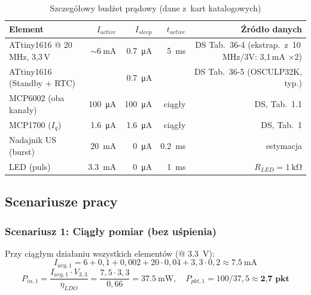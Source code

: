 \documentclass[a4paper,11pt]{article}
\begin{document}
\begin{table}[H]
    \centering
    \caption{Szczegółowy budżet prądowy (dane z~kart katalogowych)}
    \label{tab:moc_detail}
    \begin{tabular}{lrrrr}
        \toprule
        \textbf{Element} & \textbf{$I_{active}$} & \textbf{$I_{sleep}$}
            & \textbf{$t_{active}$} & \textbf{Źródło danych} \\
        \midrule
        ATtiny1616 @ 20\,MHz, 3{,}3\,V
            & ${\sim}\SI{6}{\milli\ampere}$
            & \SI{0,7}{\micro\ampere}
            & \SI{5}{\milli\second}
            & DS Tab.~36-4 (ekstrap.\ z~10\,MHz/3V: 3{,}1\,mA $\times 2$) \\
        ATtiny1616 (Standby + RTC)
            &
            & \SI{0,7}{\micro\ampere}
            &
            & DS Tab.~36-5 (OSCULP32K, typ.) \\
        MCP6002 (oba kanały)
            & \SI{100}{\micro\ampere}
            & \SI{100}{\micro\ampere}
            & ciągły
            & DS, Tab.~1.1 \\
        MCP1700 ($I_q$)
            & \SI{1,6}{\micro\ampere}
            & \SI{1,6}{\micro\ampere}
            & ciągły
            & DS, Tab.~1 \\
        Nadajnik US (burst)
            & \SI{20}{\milli\ampere}
            & \SI{0}{\micro\ampere}
            & \SI{0,2}{\milli\second}
            & estymacja \\
        LED (puls)
            & \SI{3,3}{\milli\ampere}
            & \SI{0}{\micro\ampere}
            & \SI{1}{\milli\second}
            & $R_{LED} = \SI{1}{\kilo\ohm}$ \\
        \bottomrule
    \end{tabular}
\end{table}

\subsection{Scenariusze pracy}

\subsubsection{Scenariusz 1: Ciągły pomiar (bez uśpienia)}

Przy ciągłym działaniu wszystkich elementów (@ \SI{3,3}{\volt}):
\begin{equation}
    I_{avg,1} = 6 + 0{,}1 + 0{,}002 + 20 \cdot 0{,}04 + 3{,}3 \cdot 0{,}2 \approx \SI{7,5}{\milli\ampere}
\end{equation}
\begin{equation}
    P_{in,1} = \frac{I_{avg,1} \cdot V_{3,3}}{\eta_{LDO}} = \frac{7{,}5 \cdot 3{,}3}{0{,}66} = \SI{37,5}{\milli\watt}, \quad
    P_{pkt,1} = 100/37{,}5 \approx \textbf{2,7~pkt}
\end{equation}
\end{document}
